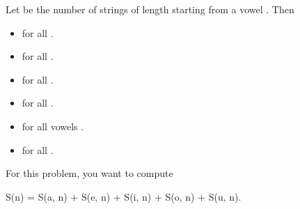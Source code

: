 \documentclass[letterpaper,12pt,english]{book}
\begin{document}
\sphinxAtStartPar
Let  be the number of strings of length  starting from a vowel .  Then
\begin{itemize}
\item {} 
\sphinxAtStartPar
{} for all .

\item {} 
\sphinxAtStartPar
{} for all .

\item {} 
\sphinxAtStartPar
{} for all .

\item {} 
\sphinxAtStartPar
{} for all .

\item {} 
\sphinxAtStartPar
{} for all vowels .

\item {} 
\sphinxAtStartPar
{} for all .

\end{itemize}

\sphinxAtStartPar
For this problem, you want to compute

\begin{sphinxVerbatim}[commandchars=\\\{\}]
S(n) = S(\PYGZsq{}a\PYGZsq{}, n) + S(\PYGZsq{}e\PYGZsq{}, n) + S(\PYGZsq{}i\PYGZsq{}, n) + S(\PYGZsq{}o\PYGZsq{}, n) + S(\PYGZsq{}u\PYGZsq{}, n).
\end{sphinxVerbatim}
\end{document}
